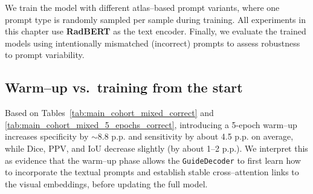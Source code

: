 \documentclass[FCD_GNN.tex]{subfiles}
\begin{document}
We train the model with different atlas--based prompt variants, where one prompt type is randomly sampled per sample during training.
All experiments in this chapter use \textbf{RadBERT} as the text encoder.
Finally, we evaluate the trained models using intentionally mismatched (incorrect) prompts to assess robustness to prompt variability.


\subsection*{Warm--up vs.\ training from the start}

Based on Tables~\ref{tab:main_cohort_mixed_correct} and \ref{tab:main_cohort_mixed_5_epochs_correct}, introducing a 5-epoch warm--up increases specificity by $\sim$8.8 \ac{p.p.} and sensitivity by about 4.5 \ac{p.p.} on average, while Dice, PPV, and IoU decrease slightly (by about 1--2 \ac{p.p.}).
We interpret this as evidence that the warm--up phase allows the \texttt{GuideDecoder} to first learn how to incorporate the textual prompts and establish stable cross--attention links to the visual embeddings, before updating the full model.
\end{document}
